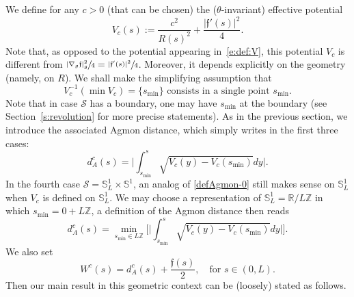 \documentclass[11pt]{article}
\numberwithin{equation}{section}
\theoremstyle{definition}
\newcommand{\calS}{\ensuremath{\mathcal S}}
\newcommand{\mb}[1]{\ensuremath{\mathbb{#1}}}
\newcommand{\R}{{\mb{R}}}
\newcommand{\bS}{\ensuremath{\mathbb S}}
\newcommand{\Z}{\mathbb Z}
\newcommand{\f}{\ensuremath{\mathfrak{f}}}
\newcommand{\ce}{c}
\begin{document}
We define for any $\ce>0$ (that can be chosen) the ($\theta$-invariant) effective potential
\begin{equation}
\label{e:def-Vce}
V_\ce (s) := \frac{\ce^2}{R(s)^2} + \frac{| \f'(s)|^2}{4}.
\end{equation}
Note that, as opposed to the potential appearing in~\eqref{e:def:V}, this potential $V_\ce$ is different from $\sfrac{|\nabla_g\f|_g^2}{4} = \sfrac{| \f'(s)|^2}{4}$.
Moreover, it depends explicitly on the geometry (namely, on $R$).
We shall make the simplifying assumption that
\begin{equation}
\label{s:asspt-uniq-min}
V_{\ce}^{-1}(\min V_\ce) = \{s_{\min}\} \text{ consists in a single point }s_{\min}.
\end{equation}
Note that in case $\calS$ has a boundary, one may have $s_{\min}$ at the boundary (see Section~\ref{s:revolution} for more precise statements).
As in the previous section, we introduce the associated Agmon distance, which simply writes in the first three cases:
\begin{equation}
\label{e:defbisdA}
d_{A}^{\ce}(s) = \biggl| \int_{s_{\min}}^s \sqrt{ V_\ce(y)- V_\ce(s_{\min})} dy \biggr|.
\end{equation}
In the fourth case $\calS = \bS^1_L\times \bS^1$, an analog of \eqref{defAgmon-0} still makes sense on $\bS^1_L$ when $V_{\ce}$ is defined on $\bS^1_L$. We may choose a representation of $\bS^1_L=\R/L\Z$ in which $s_{\min}= 0 + L \Z$, a definition of the Agmon distance then reads
\begin{equation}
\label{e:defbisdAT2}
d_{A}^{\ce}(s) = \min_{s_{\min}\in L \Z}\biggl[ \biggl| \int_{s_{\min}}^s \sqrt{ V_\ce(y)- V_\ce(s_{\min})} dy \biggr|\biggr].
\end{equation}
We also set
\begin{equation}
\label{e:def-Wce}
W^{\ce}(s)=d_A^{\ce}(s)+\frac{\f(s)}{2},\quad \text{for } s \in (0,L).
\end{equation}
Then our main result in this geometric context can be (loosely) stated as follows.
\end{document}
